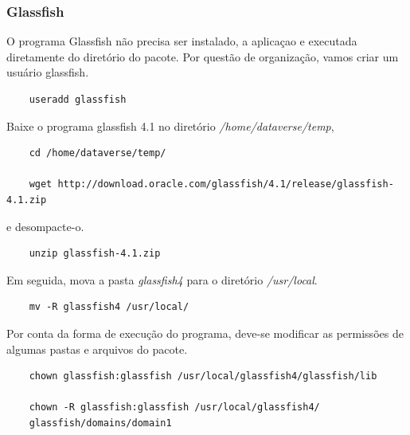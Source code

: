 \documentclass[12pt,hidelinks]{article}
\begin{document}
        \subsubsection{Glassfish}
        
        \qquad O programa Glassfish não precisa ser instalado, a aplicaçao e executada diretamente do diretório do pacote. Por questão de organização, vamos criar um usuário glassfish.
        \begin{verbatim}
    useradd glassfish
        \end{verbatim}
        
        Baixe o programa glassfish 4.1 no diretório \textit{/home/dataverse/temp},
        \begin{verbatim}
    cd /home/dataverse/temp/
    
    wget http://download.oracle.com/glassfish/4.1/release/glassfish-4.1.zip
        \end{verbatim}
        e desompacte-o.
        \begin{verbatim}
    unzip glassfish-4.1.zip
        \end{verbatim}  
        
        Em seguida, mova a pasta \textit{glassfish4} para o diretório \textit{/usr/local}.
        \begin{verbatim}
    mv -R glassfish4 /usr/local/
        \end{verbatim}
        Por conta da forma de execução do programa, deve-se modificar as permissões de algumas pastas e arquivos do pacote.
        \begin{verbatim}
    chown glassfish:glassfish /usr/local/glassfish4/glassfish/lib
    
    chown -R glassfish:glassfish /usr/local/glassfish4/
    glassfish/domains/domain1
        \end{verbatim}
        
\end{document}
